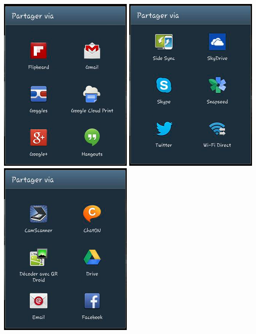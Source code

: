 \documentclass{report}
\begin{document}
\begin{center}
\includegraphics[scale=0.5]{images/share1}
\includegraphics[scale=0.5]{images/share2}
\includegraphics[scale=0.5]{images/share3}
\end{center}
\bigskip
\end{document}

